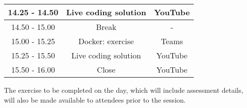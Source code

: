 \documentclass{article}
\begin{document}
\begin{table}[h!]
\begin{tabular}{c|c|c}
         \hline 
         
         14.25 - 14.50 & Live coding solution & YouTube \\ 
         
         \hline 
         
         14.50 - 15.00 & Break & - \\ 
         
         \hline 
         
         15.00 - 15.25 & Docker: exercise & Teams \\ 
         
         \hline 
         
         15.25 - 15.50 & Live coding solution & YouTube \\ 
         
         \hline 
         
         15.50 - 16.00 & Close & YouTube \\ 
         
         \hline
         
    \end{tabular}
\end{table}

The exercise to be completed on the day, which will include assessment
details, will also be made available to attendees prior to the session.
\end{document}
